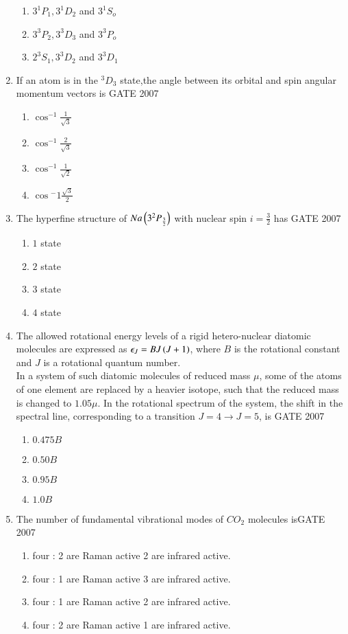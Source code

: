 \documentclass[journal]{IEEEtran}
\begin{document}
\begin{enumerate}
\begin{enumerate}
     \item $3^1P_1,3^1D_2$ and $3^1S_o$
      \item $3^3P_2,3^3D_3$ and $3^3P_o$
       \item $2^3S_1,3^3D_2$ and $3^3D_1$
\end{enumerate}
\item If an atom is in the ${}^3D_3$ state,the angle between its orbital and spin angular momentum vectors  is 
\hfill{GATE 2007}\begin{enumerate}
    \item $\cos^{-1}{\frac{1}{\sqrt{3}}}$
     \item $\cos^{-1}\frac{2}{\sqrt{3}}$
      \item $\cos^{-1}\frac{1}{\sqrt{2}}$
       \item $\cos{^-1}\frac{\sqrt{3}}{2}$
\end{enumerate}
\item The hyperfine structure of $Na\left(3^2P_{\frac{3}{2}}\right)$ with nuclear spin $i=\frac{3}{2}$ has
\hfill{GATE 2007}\begin{enumerate}
    \item $1$ state
    \item $2$ state
    \item $3$ state
    \item $4$ state
\end{enumerate}
\item The allowed rotational energy levels of a rigid hetero-nuclear diatomic molecules are expressed as $\epsilon_J=BJ\left(J+1\right)$, where $B$ is the rotational constant and $J$ is a rotational quantum number.\\
In a system of such diatomic molecules of reduced mass $\mu$, some of the atoms of one element are replaced by a heavier isotope, such that the reduced mass is changed to $1.05\mu$. In the rotational spectrum of the system, the shift in the spectral line, corresponding to a transition $J=4\xrightarrow{}J=5$, is
\hfill{GATE 2007}

\begin{enumerate}
    \item $0.475B$
    \item $0.50 B$
    \item $0.95 B$
    \item $1.0 B$
    
\end{enumerate}
\item The number of fundamental vibrational modes of $CO_2$ molecules is\hfill{GATE 2007} 
\begin{enumerate}
    \item four : 2 are Raman active 2 are infrared active.
     \item four : 1 are Raman active 3 are infrared active.
      \item four : 1 are Raman active 2 are infrared active.
       \item four : 2 are Raman active 1 are infrared active.
    

\end{enumerate}
\end{enumerate}
\end{document}
